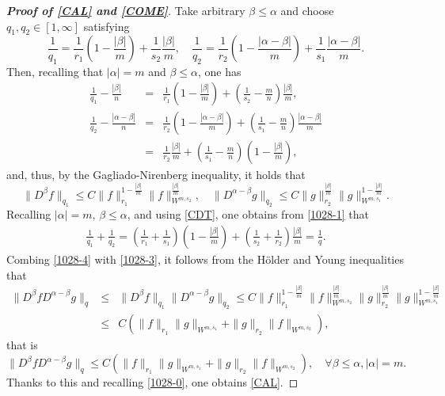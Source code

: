 \documentclass[12pt,reqno]{amsart}
\numberwithin{equation}{section}
\begin{document}
\begin{proof}[\textbf{Proof of \eqref{CAL} and \eqref{COME}}]
Take arbitrary $\beta\leq\alpha$ and choose $q_1, q_2\in[1,\infty]$ satisfying
\begin{equation}
  \frac{1}{q_1}=\frac1{r_1}\left(1-\frac{|\beta|}{m}\right)+\frac1{s_2}\frac{|\beta|}m,\quad
 \frac{1}{q_2}=\frac1{r_2}\left(1-\frac{|\alpha-\beta|}{m}\right)+\frac1{s_1}\frac{|\alpha-\beta|}m. \label{1028-1}
\end{equation}
Then, recalling that $|\alpha|=m$ and $\beta\leq\alpha$, one has
\begin{eqnarray*}
 \frac{1}{q_1}-\frac{|\beta|}n&=&\frac1{r_1}\left(1-\frac{|\beta|}{m}\right)+\left(\frac1{s_2}-\frac mn\right)\frac{|\beta|}m,\\
 \frac{1}{q_2}-\frac{|\alpha-\beta|}n&=&\frac1{r_2}\left(1-\frac{|\alpha-\beta|}{m}\right)+\left(\frac1{s_1}-\frac m n\right)\frac{|\alpha-\beta|}m\\
 &=&\frac1{r_2} \frac{|\beta|}{m}+\left(\frac1{s_1}-\frac m n\right)\left(1-\frac{|\beta|}{m}\right),
\end{eqnarray*}
and, thus, by the Gagliado-Nirenberg inequality, it holds that
\begin{equation}
  \label{1028-4}
  \|D^\beta f\|_{q_1}\leq C\|f\|_{r_1}^{1-\frac{|\beta|}m}\|f\|_{W^{m,s_2}}^{\frac{|\beta|}m}, \quad  \|D^{\alpha-\beta}g\|_{q_2}\leq C\|g\|_{r_2}^{\frac{|\beta|}m}\|g\|_{W^{m,s_1}}^{1-\frac{|\beta|}m}.
\end{equation}
Recalling $|\alpha|=m$, $\beta\leq\alpha$, and using \eqref{CDT}, one obtains from \eqref{1028-1} that
\begin{eqnarray}
  \frac1{q_1}+\frac1{q_2}=\left(\frac1{r_1}+\frac1{s_1}\right)\left(1-\frac{|\beta|}m\right)+\left(\frac1{s_2}+\frac1{r_2}\right)\frac{|\beta|}m=\frac1q. \label{1028-3}
\end{eqnarray}
Combing \eqref{1028-4} with \eqref{1028-3}, it follows from the H\"older and Young inequalities that
\begin{eqnarray*}
  \|D^\beta fD^{\alpha-\beta}g\|_q&\leq& \|D^\beta f\|_{q_1}\|D^{\alpha-\beta}g\|_{q_2}
  \leq C \|f\|_{r_1}^{1-\frac{|\beta|}m}\|f\|_{W^{m,s_2}}^{\frac{|\beta|}m} \|g\|_{r_2}^{\frac{|\beta|}m}\|g\|_{W^{m,s_1}}^{1-\frac{|\beta|}m}\nonumber\\
  &\leq&C\left(\|f\|_{r_1}\|g\|_{W^{m, s_1}}+\|g\|_{r_2}\|f\|_{W^{m,s_2}}\right),
\end{eqnarray*}
that is
\begin{equation}
  \label{1028-5}
  \|D^\beta fD^{\alpha-\beta}g\|_q \leq C\left(\|f\|_{r_1}\|g\|_{W^{m, s_1}}+\|g\|_{r_2}\|f\|_{W^{m,s_2}}\right),\quad\forall\beta\leq\alpha, |\alpha|=m.
\end{equation}
Thanks to this and recalling \eqref{1028-0}, one obtains \eqref{CAL}.


\end{proof}
\end{document}
